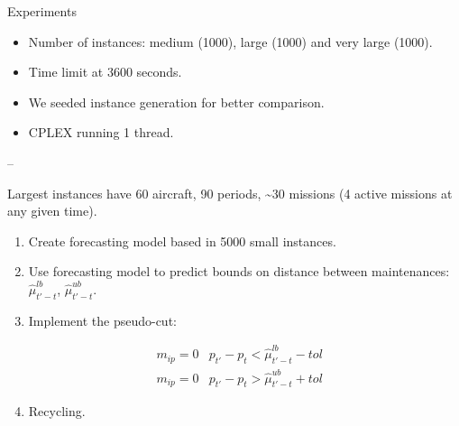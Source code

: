 \documentclass[usenames,dvipsnames]{beamer}
\begin{document}
\begin{frame}

\begin{block}{Experiments}

\begin{itemize}[<+->]

\item
  Number of instances: medium (1000), large (1000) and very large
  (1000).
\item
  Time limit at 3600 seconds.
\item
  We seeded instance generation for better comparison.
\item
  CPLEX running 1 thread.
\end{itemize}

--

Largest instances have 60 aircraft, 90 periods, \textasciitilde{}30
missions (4 active missions at any given time).

\begin{enumerate}[<+->]

\item
  Create forecasting model based in 5000 small instances.
\item
  Use forecasting model to predict bounds on distance between
  maintenances: \(\hat{\mu}_{t'-t}^{lb}\), \(\hat{\mu}_{t'-t}^{ub}\).
\item
  Implement the pseudo-cut:
\end{enumerate}

\begin{align}
    & m_{ip} = 0 & p_{t'} - p_t < \hat{\mu}_{t'-t}^{lb} - tol \label{eq:dist_lb} \\
    & m_{ip} = 0  &  p_{t'} - p_t > \hat{\mu}_{t'-t}^{ub} + tol \label{eq:dist_ub}
\end{align}

\begin{enumerate}[<+->]
\setcounter{enumi}{3}

\item
  Recycling.
\end{enumerate}

\end{block}

\end{frame}
\end{document}
